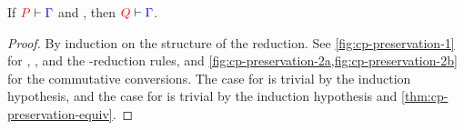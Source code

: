 \begin{theorem}[Preservation]\label{thm:cp-preservation}
  If $\seq[{ P }]{ \Gamma }$ and ,
  then $\seq[{ Q }]{ \Gamma }$.
\end{theorem}
  \begin{proof}
    By induction on the structure of the reduction. See
    \cref{fig:cp-preservation-1} for , , and the
    \textbeta-reduction rules, and
    \cref{fig:cp-preservation-2a,fig:cp-preservation-2b} for the commutative
    conversions. 
    The case for \cpRedGammaCut is trivial by the induction hypothesis, and the
    case for \cpRedGammaEquiv is trivial by the induction hypothesis and
    \cref{thm:cp-preservation-equiv}. 
  \end{proof}
